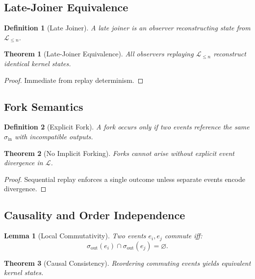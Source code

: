 \documentclass[11pt]{article}
\newtheorem{definition}{Definition}
\newtheorem{theorem}{Theorem}
\newtheorem{lemma}{Lemma}
\begin{document}
\subsection{Late-Joiner Equivalence}

\begin{definition}[Late Joiner]
A late joiner is an observer reconstructing state from $\mathcal{L}_{\le n}$.
\end{definition}

\begin{theorem}[Late-Joiner Equivalence]
All observers replaying $\mathcal{L}_{\le n}$ reconstruct identical kernel states.
\end{theorem}

\begin{proof}
Immediate from replay determinism.
\end{proof}

\subsection{Fork Semantics}

\begin{definition}[Explicit Fork]
A fork occurs only if two events reference the same $\sigma_{\text{in}}$ with incompatible
outputs.
\end{definition}

\begin{theorem}[No Implicit Forking]
Forks cannot arise without explicit event divergence in $\mathcal{L}$.
\end{theorem}

\begin{proof}
Sequential replay enforces a single outcome unless separate events encode divergence.
\end{proof}

\subsection{Causality and Order Independence}

\begin{lemma}[Local Commutativity]
Two events $e_i, e_j$ commute iff:
\[
\sigma_{\text{out}}(e_i) \cap \sigma_{\text{out}}(e_j) = \varnothing.
\]
\end{lemma}

\begin{theorem}[Causal Consistency]
Reordering commuting events yields equivalent kernel states.
\end{theorem}
\end{document}
